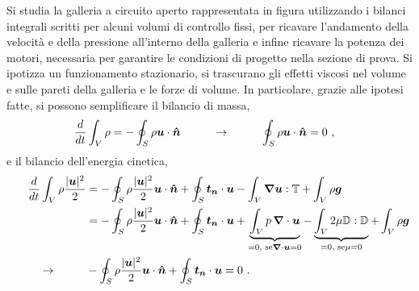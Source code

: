 \partone
Si studia la galleria a circuito aperto rappresentata in figura utilizzando i bilanci integrali scritti per alcuni volumi di controllo fissi, per ricavare l'andamento della velocità e della pressione all'interno della galleria e infine ricavare la potenza dei motori, necessaria per garantire le condizioni di progetto nella sezione di prova. Si ipotizza un funzionamento stazionario, si trascurano gli effetti viscosi nel volume e sulle pareti della galleria e le forze di volume. In particolare, grazie alle ipotesi fatte, si possono semplificare il bilancio di massa,
\begin{equation}
\begin{aligned}
 & \dfrac{d}{dt} \int_V \rho = - \oint_{S} \rho \bm{u} \cdot \bm{\hat{n}} 
 \hspace{1.0cm} \rightarrow \hspace{1.0cm} \oint_{S} \rho \bm{u} \cdot \bm{\hat{n}} = 0 \ ,
\end{aligned}
\end{equation}
e il bilancio dell'energia cinetica,
\begin{equation}
\begin{aligned}
 \dfrac{d}{dt} \int_V \rho \dfrac{|\bm{u}|^2}{2} & = - \oint_{S} \rho \dfrac{|\bm{u}|^2}{2} \bm{u} \cdot \bm{\hat{n}} + \oint_S \bm{t_n} \cdot \bm{u} - \int_V \bm{\nabla} \bm{u} : \mathbb{T} + \int_V \rho \bm{g} \\
                                                 & = - \oint_{S} \rho \dfrac{|\bm{u}|^2}{2} \bm{u} \cdot \bm{\hat{n}} + \oint_S \bm{t_n} \cdot \bm{u} + 
 \underbrace{\int_V  p \, \bm{\nabla} \cdot \bm{u}}_{=0 \text{, se} \bm{\nabla} \cdot \bm{u} = 0}
 - \underbrace{ \int_V 2 \mu \mathbb{D} : \mathbb{D}}_{=0 \text{, se} \mu = 0} + \int_V \rho \bm{g} \\
 \hspace{1.0cm} \rightarrow \hspace{1.0cm}  &
 - \oint_{S} \rho \dfrac{|\bm{u}|^2}{2} \bm{u} \cdot \bm{\hat{n}} + \oint_S \bm{t_n} \cdot \bm{u} = 0 \ . 
\end{aligned}
\end{equation}

